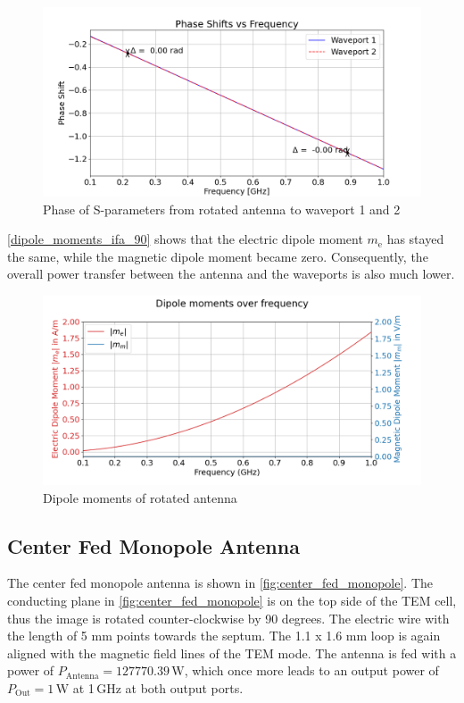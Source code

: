 \begin{figure}[h]
    \centering
    \includegraphics[width=1\linewidth]{Documentation//content//30_simulations//img/phase_shift_90_ifa.png}
    \caption{Phase of S-parameters from rotated antenna to waveport 1 and 2}
    \label{fig:phase_shift_90_ifa}
\end{figure}

\autoref{dipole_moments_ifa_90} shows that the electric dipole moment $m_\mathrm{e}$ has stayed the same, while the magnetic dipole moment became zero. Consequently, the overall power transfer between the antenna and the waveports is also much lower. 

\begin{figure}[h]
    \centering
    \includegraphics[width=1\linewidth]{Documentation//content//30_simulations//img/dipole_moments_ifa_90.png}
    \caption{Dipole moments of rotated antenna}
    \label{fig:dipole_moments_ifa_90}
\end{figure}


\subsection{Center Fed Monopole Antenna}

The center fed monopole antenna is shown in \autoref{fig:center_fed_monopole}. The conducting plane in \autoref{fig:center_fed_monopole} is on the top side of the TEM cell, thus the image is rotated counter-clockwise by 90 degrees. The electric wire with the length of 5 mm points towards the septum. The 1.1 x 1.6 mm loop is again aligned with the magnetic field lines of the TEM mode. The antenna is fed with a power of $P_\mathrm{Antenna}=127770.39\,\mathrm{W}$, which once more leads to an output power of $P_\mathrm{Out}=1\,\mathrm{W}$ at 1\,GHz at both output ports. 

